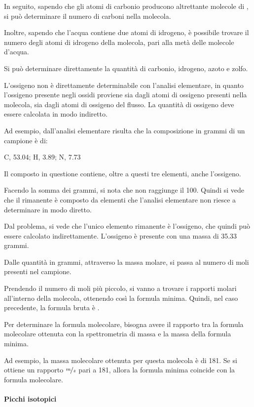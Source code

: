 In seguito, sapendo che gli atomi di carbonio producono altrettante
molecole di , si può determinare il numero di carboni nella
molecola.

Inoltre, sapendo che l'acqua contiene due atomi di idrogeno, è possibile
trovare il numero degli atomi di idrogeno della molecola, pari alla metà
delle molecole d'acqua.

Si può determinare direttamente la quantità di carbonio, idrogeno, azoto
e zolfo.

L'ossigeno non è direttamente determinabile con l'analisi elementare, in
quanto l'ossigeno presente negli ossidi proviene sia dagli atomi di
ossigeno presenti nella molecola, sia dagli atomi di ossigeno del
flusso. La quantità di ossigeno deve essere calcolata in modo indiretto.

Ad esempio, dall'analisi elementare risulta che la composizione in
grammi di un campione è di:

\begin{center}
  C, 53.04; H, 3.89; N, 7.73
\end{center}

Il composto in questione contiene, oltre a questi tre elementi, anche
l'ossigeno.

Facendo la somma dei grammi, si nota che non raggiunge il 100. Quindi si
vede che il rimanente è composto da elementi che l'analisi elementare
non riesce a determinare in modo diretto.

Dal problema, si vede che l'unico elemento rimanente è l'ossigeno, che
quindi può essere calcolato indirettamente. L'ossigeno è presente con
una massa di 35.33 grammi.

Dalle quantità in grammi, attraverso la massa molare, si passa al numero
di moli presenti nel campione.

Prendendo il numero di moli più piccolo, si vanno a trovare i rapporti
molari all'interno della molecola, ottenendo così la formula minima.
Quindi, nel caso precedente, la formula bruta è .

Per determinare la formula molecolare, bisogna avere il rapporto tra la
formula molecolare ottenuta con la spettrometria di massa e la massa
della formula minima.

Ad esempio, la massa molecolare ottenuta per questa molecola è di 181.
Se si ottiene un rapporto $\nicefrac{m}{z}$ pari a 181, allora la formula minima
coincide con la formula molecolare.

\paragraph{Picchi isotopici}

